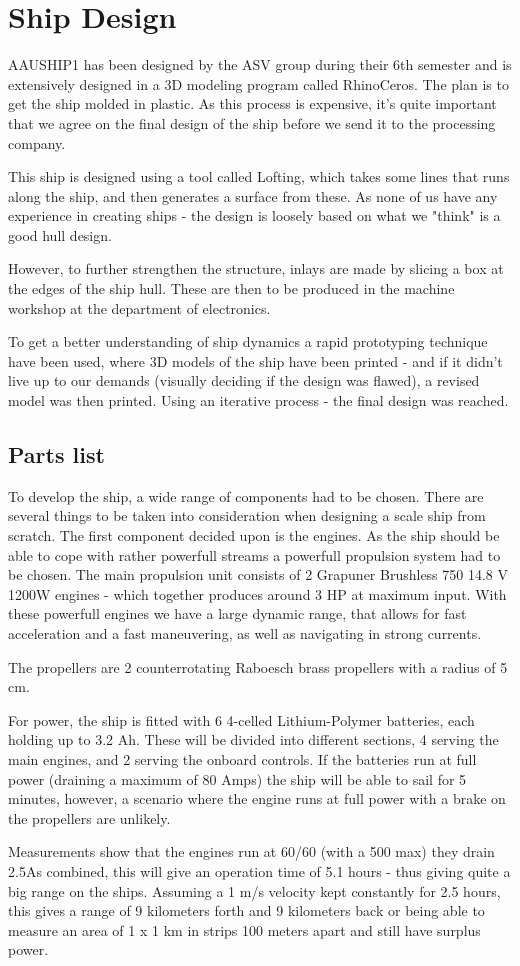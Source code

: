 \chapter{Ship Design}
AAUSHIP1 has been designed by the ASV group during their 6th semester and is extensively designed in a 3D modeling program called RhinoCeros. The plan is to get the ship molded in plastic. As this process is expensive, it's quite important that we agree on the final design of the ship before we send it to the processing company. 

This ship is designed using a tool called Lofting, which takes some lines that runs along the ship, and then generates a surface from these. As none of us have any experience in creating ships - the design is loosely based on what we "think" is a good hull design. 

However, to further strengthen the structure, inlays are made by slicing a box at the edges of the ship hull. These are then to be produced in the machine workshop at the department of electronics. 

To get a better understanding of ship dynamics a rapid prototyping technique have been used, where 3D models of the ship have been printed - and if it didn't live up to our demands (visually deciding if the design was flawed), a revised model was then printed. Using an iterative process - the final design was reached. 

\section{Parts list}
To develop the ship, a wide range of components had to be chosen. There are several things to be taken into consideration when designing a scale ship from scratch. The first component decided upon is the engines. As the ship should be able to cope with rather powerfull streams a powerfull propulsion system had to be chosen. The main propulsion unit consists of 2 Grapuner Brushless 750 14.8 V 1200W engines - which together produces around 3 HP at maximum input. With these powerfull engines we have a large dynamic range, that allows for fast acceleration and a fast maneuvering, as well as navigating in strong currents. 

The propellers are 2 counterrotating Raboesch brass propellers with a radius of 5 cm. 

For power, the ship is fitted with 6 4-celled Lithium-Polymer batteries, each holding up to 3.2 Ah. These will be divided into different sections, 4 serving the main engines, and 2 serving the onboard controls. If the batteries run at full power (draining a maximum of 80 Amps) the ship will be able to sail for 5 minutes, however, a scenario where the engine runs at full power with a brake on the propellers are unlikely.

Measurements show that the engines run at 60/60 (with a 500 max) they drain 2.5As combined, this will give an operation time of 5.1 hours - thus giving quite a big range on the ships. Assuming a 1 m/s velocity kept constantly for 2.5 hours, this gives a range of 9 kilometers forth and 9 kilometers back or being able to measure an area of 1 x 1 km in strips 100 meters apart and still have surplus power.